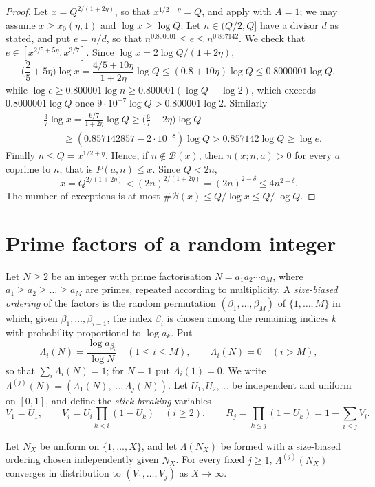\documentclass[11pt,colorlinks]{charlie}
\newcommand{\cB}{\mathcal{B}}
\begin{document}
\begin{proof}
Let $x=Q^{2/(1+2\eta)}$, so that $x^{1/2+\eta}=Q$, and apply  with $A=1$; we may assume $x\ge x_0(\eta,1)$ and $\log x\ge\log Q$. Let $n\in(Q/2,Q]$ have a divisor $d$ as stated, and put $e=n/d$, so that $n^{0.800001}\le e\le n^{0.857142}$. We check that $e\in[x^{2/5+5\eta},x^{3/7}]$. Since $\log x=2\log Q/(1+2\eta)$,
\[
 \Big(\frac25+5\eta\Big)\log x=\frac{4/5+10\eta}{1+2\eta}\log Q\le(0.8+10\eta)\log Q\le0.8000001\log Q,
\]
while $\log e\ge0.800001\log n\ge0.800001(\log Q-\log2)$, which exceeds $0.8000001\log Q$ once $9\cdot10^{-7}\log Q>0.800001\log2$. Similarly
\begin{align*}
 &\frac37\log x=\frac{6/7}{1+2\eta}\log Q\ge\Big(\frac67-2\eta\Big)\log Q\\
 &\qquad\ge(0.857142857-2\cdot10^{-8})\log Q>0.857142\log Q\ge\log e.
\end{align*}
Finally $n\le Q=x^{1/2+\eta}$. Hence, if $n\notin\cB(x)$, then $\pi(x;n,a)>0$ for every $a$ coprime to $n$, that is $P(a,n)\le x$. Since $Q<2n$,
\[
 x=Q^{2/(1+2\eta)}<(2n)^{2/(1+2\eta)}=(2n)^{2-\delta}\le4n^{2-\delta}.
\]
The number of exceptions is at most $\#\cB(x)\le Q/\log x\le Q/\log Q$.
\end{proof}

\section{Prime factors of a random integer}\label{sec:DG}
Let $N\ge2$ be an integer with prime factorisation $N=a_1a_2\cdots a_M$, where $a_1\ge a_2\ge\dots\ge a_M$ are primes, repeated according to multiplicity. A \emph{size-biased ordering} of the factors is the random permutation $(\beta_1,\dots,\beta_M)$ of $\{1,\dots,M\}$ in which, given $\beta_1,\dots,\beta_{i-1}$, the index $\beta_i$ is chosen among the remaining indices $k$ with probability proportional to $\log a_k$. Put
\[
 \Lambda_i(N)=\frac{\log a_{\beta_i}}{\log N}\quad(1\le i\le M),\qquad\Lambda_i(N)=0\quad(i>M),
\]
so that $\sum_i\Lambda_i(N)=1$; for $N=1$ put $\Lambda_i(1)=0$. We write $\Lambda^{(j)}(N)=(\Lambda_1(N),\dots,\Lambda_j(N))$. Let $U_1,U_2,\dots$ be independent and uniform on $[0,1]$, and define the \emph{stick-breaking} variables
\[
 V_1=U_1,\qquad V_i=U_i\prod_{k<i}(1-U_k)\quad(i\ge2),\qquad R_j=\prod_{k\le j}(1-U_k)=1-\sum_{i\le j}V_i .
\]

\begin{theorem}\label{thm:DG}
Let $N_X$ be uniform on $\{1,\dots,X\}$, and let $\Lambda(N_X)$ be formed with a size-biased ordering chosen independently given $N_X$. For every fixed $j\ge1$, $\Lambda^{(j)}(N_X)$ converges in distribution to $(V_1,\dots,V_j)$ as $X\to\infty$.
\end{theorem}
\end{document}
